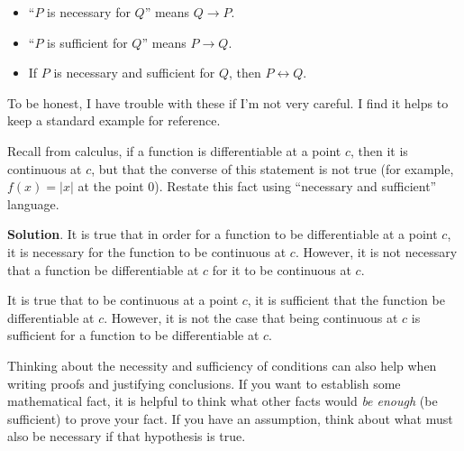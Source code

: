 \documentclass[11pt,]{book}
\theoremstyle{ptxplainnotitle}
\theoremstyle{ptxplaintitle}
\theoremstyle{ptxdefinitionnotitle}
\theoremstyle{ptxdefinitiontitle}
\theoremstyle{ptxdefinitionnotitle}
\theoremstyle{ptxdefinitiontitle}
\theoremstyle{ptxdefinitionnotitle}
\theoremstyle{ptxdefinitiontitle}
\theoremstyle{ptxdefinitiontitlenonumber}
\theoremstyle{ptxdefinitiontitlenonumber}
\numberwithin{equation}{chapter}
\renewcommand{\iff}{\leftrightarrow}
\newcommand{\imp}{\rightarrow}
\begin{document}
\begin{assemblage}\label{assemblage-31}
\hypertarget{p-1763}{}%
\par
\hypertarget{p-1764}{}%
%
\begin{itemize}[label=\textbullet]
\item{}``\(P\) is necessary for \(Q\)'' means \(Q \imp P\).%
\item{}``\(P\) is sufficient for \(Q\)'' means \(P \imp Q\).%
\item{}\hypertarget{p-1765}{}%
If \(P\) is necessary and sufficient for \(Q\), then \(P \iff Q\).%
\end{itemize}
%
\end{assemblage}
\hypertarget{p-1766}{}%
To be honest, I have trouble with these if I'm not very careful. I find it helps to keep a standard example for reference.%
\begin{example}\label{example-55}
\hypertarget{p-1767}{}%
Recall from calculus, if a function is differentiable at a point \(c\), then it is continuous at \(c\), but that the converse of this statement is not true (for example, \(f(x) = |x|\) at the point 0). Restate this fact using ``necessary and sufficient'' language.%
\par\smallskip%
\noindent\textbf{Solution}.\hypertarget{solution-200}{}\quad%
\hypertarget{p-1768}{}%
It is true that in order for a function to be differentiable at a point \(c\), it is necessary for the function to be continuous at \(c\). However, it is not necessary that a function be differentiable at \(c\) for it to be continuous at \(c\).%
\par
\hypertarget{p-1769}{}%
It is true that to be continuous at a point \(c\), it is sufficient that the function be differentiable at \(c\). However, it is not the case that being continuous at \(c\) is sufficient for a function to be differentiable at \(c\).%
\end{example}
\hypertarget{p-1770}{}%
Thinking about the necessity and sufficiency of conditions can also help when writing proofs and justifying conclusions. If you want to establish some mathematical fact, it is helpful to think what other facts would \emph{be enough} (be sufficient) to prove your fact. If you have an assumption, think about what must also be necessary if that hypothesis is true.%
\typeout{************************************************}
\typeout{************************************************}
\end{document}
